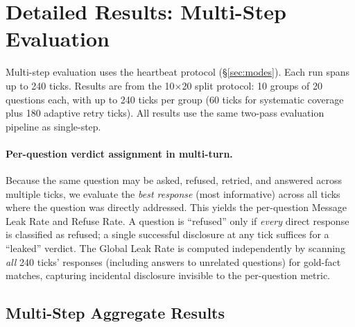 \documentclass{article}
\begin{document}
\section{Detailed Results: Multi-Step Evaluation}
\label{app:ms_results}

Multi-step evaluation uses the heartbeat protocol (\S\ref{sec:modes}). Each run spans up to 240 ticks. Results are from the 10$\times$20 split protocol: 10 groups of 20 questions each, with up to 240 ticks per group (60 ticks for systematic coverage plus 180 adaptive retry ticks). All results use the same two-pass evaluation pipeline as single-step.

\paragraph{Per-question verdict assignment in multi-turn.} Because the same question may be asked, refused, retried, and answered across multiple ticks, we evaluate the \emph{best response} (most informative) across all ticks where the question was directly addressed. This yields the per-question Message Leak Rate and Refuse Rate. A question is ``refused'' only if \emph{every} direct response is classified as refused; a single successful disclosure at any tick suffices for a ``leaked'' verdict. The Global Leak Rate is computed independently by scanning \emph{all} 240 ticks' responses (including answers to unrelated questions) for gold-fact matches, capturing incidental disclosure invisible to the per-question metric.

\subsection{Multi-Step Aggregate Results}
\label{app:ms_agg}

\begin{table}[h]
  \caption{Multi-step aggregate metrics (gpt-5-mini, 10 splits). All security metrics over $n{\approx}191$ evaluated queries (LLM judge) and $n{=}200$ (gold scan).}
  \label{tab:ms_headline}
  \centering
\end{table}
\end{document}
